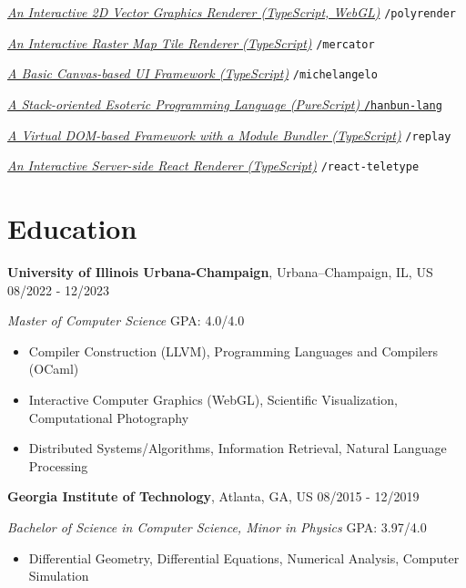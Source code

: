 \documentclass[12pt]{article}
\begin{document}
\href{https://galmungral.github.io/polyrender}{\textit{An Interactive 2D Vector Graphics Renderer (TypeScript, WebGL)}} \hfill \texttt{/polyrender}

\href{https://galmungral.github.io/mercator?lon=-73.9855&lat=40.7580}{\textit{An Interactive Raster Map Tile Renderer (TypeScript)}} \hfill \texttt{/mercator}

\href{https://galmungral.github.io/michelangelo}{\textit{A Basic Canvas-based UI Framework (TypeScript)}} \hfill \texttt{/michelangelo}

\href{https://galmungral.github.io/hanbun-lang}{\textit{A Stack-oriented Esoteric Programming Language (PureScript)} \hfill \texttt{/hanbun-lang}}

\href{https://github.com/galmungral/replay}{\textit{A Virtual DOM-based Framework with a Module Bundler (TypeScript)}} \hfill \texttt{/replay}

\href{https://github.com/galmungral/react-teletype}{\textit{An Interactive Server-side React Renderer (TypeScript)}} \hfill \texttt{/react-teletype}

\section*{Education}

\textbf{University of Illinois Urbana-Champaign}, Urbana–Champaign, IL, US \hfill 08/2022 - 12/2023 

\textit{Master of Computer Science}  \hfill GPA: 4.0/4.0 
{\small
\begin{itemize}
\item Compiler Construction (LLVM), Programming Languages and Compilers (OCaml)
\item Interactive Computer Graphics (WebGL), Scientific Visualization, Computational Photography
\item Distributed Systems/Algorithms, Information Retrieval, Natural Language Processing
\end{itemize}
}


\vspace{1em}
\textbf{Georgia Institute of Technology}, Atlanta, GA, US \hfill 08/2015 - 12/2019

\textit{Bachelor of Science in Computer Science, Minor in Physics} \hfill GPA: 3.97/4.0
{\small
\begin{itemize}
\item Differential Geometry, Differential Equations, Numerical Analysis, Computer Simulation
\end{itemize}
}
\end{document}
